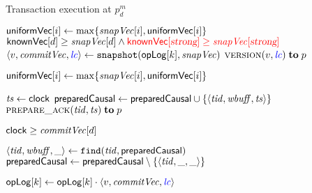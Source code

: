 
\begin{algorithm*}[t]
  \caption{Transaction execution at $p^m_d$}
  \label{alg:unistore-replica}
  \begin{algorithmic}[1]
      \label{line:function-readkey}
        \label{line:readkey-uniformvc-i}
        \State ${\sf uniformVec}[i] \gets \max\{\mathit{snapVec}[i], {\sf uniformVec}[i]\}$
          \label{line:readkey-uniformvc}
      \EndFor
       ${\sf knownVec}[d] \geq \mathit{snapVec}[d]
          \land \textcolor{red}{{\sf knownVec}[\textsl{strong}] \ge \mathit{snapVec}[\textsl{strong}]}$
        \label{line:readkey-wait-util-knownvc}
      \hStatex
      \State $\langle v, \mathit{commitVec}, \textcolor{blue}{\mathit{lc}} \rangle \gets \texttt{snapshot}({\sf opLog}[k], \mathit{snapVec})$
        \label{line:readkey-read}
      \State  {}
      \State \send $\textsc{version}(v, \textcolor{blue}{\mathit{lc}}) \;{\bf to}\; p$
        \label{line:readkey-return}
    \EndWhenRcv

    \Statex
      \label{line:function-preparecausal}
        \State ${\sf uniformVec}[i] \gets \max\{\mathit{snapVec}[i], {\sf uniformVec}[i]\}$
        \label{line:preparecausal-uniformvc}
      \EndFor

      \State \var $\mathit{ts} \gets {\sf clock}$
        \label{line:preparecausal-ts}
      \State ${\sf preparedCausal} \gets {\sf preparedCausal} \cup
        \{\langle \mathit{tid}, \mathit{wbuff}, \mathit{ts} \rangle\}$
        \label{line:preparecausal-preparedcausal}
      \State \send $\Call{\prepareack}{\tidvar, \tsvar} \sendto p$
        \label{line:preparecausal-call-preparecausalack}
    \EndWhenRcv

    \Statex
    \WhenRcv[$\Call{\commit}{\tidvar, \commitvc, \lccolor{\lcvar}}$]
      \label{line:function-commit}
      \State \wait\until ${\sf clock} \geq \mathit{commitVec}[d]$
        \label{line:commit-wait-clock}

      \hStatex
      \State $\langle \mathit{tid}, \mathit{wbuff}, \_ \rangle \gets \texttt{find}(\mathit{tid}, {\sf preparedCausal})$
        \label{line:commit-find}
      \State ${\sf preparedCausal} \gets {\sf preparedCausal} \setminus \{\langle \mathit{tid}, \_, \_\rangle\}$
        \label{line:commit-preparedcausal}

        \State ${\sf opLog}[k] \gets {\sf opLog}[k] \cdot \langle v, \mathit{commitVec}, \textcolor{blue}{\mathit{lc}} \rangle$
        \label{line:commit-oplog}
      \EndFor


\end{algorithmic}
\end{algorithm*}
